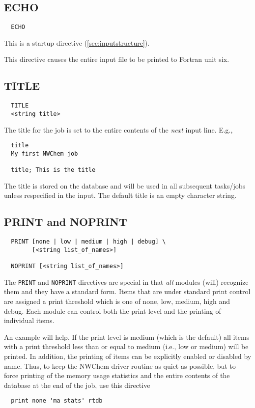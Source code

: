 \subsection{ECHO}

\begin{verbatim}
  ECHO
\end{verbatim}

This is a startup directive (\ref{sec:inputstructure}).

This directive causes the entire input file to be printed to Fortran
unit six.

\subsection{TITLE}

\begin{verbatim}
  TITLE 
  <string title>
\end{verbatim}

  The title for the job is set to the entire contents of the {\em
next} input line.  E.g.,
\begin{verbatim}
  title
  My first NWChem job

  title; This is the title
\end{verbatim}
The title is stored on the database and will be used in all subsequent
tasks/jobs unless respecified in the input.  The default title is an
empty character string.

\subsection{PRINT and NOPRINT}
\label{sec:printcontrol}

\begin{verbatim}
  PRINT [none | low | medium | high | debug] \
        [<string list_of_names>]

  NOPRINT [<string list_of_names>]
\end{verbatim}

The \verb+PRINT+ and \verb+NOPRINT+ directives are special in that
{\em all} modules (will) recognize them and they  have a
standard form.  Items that are under standard print control are
assigned a print threshold which is one of none, low, medium, high and
debug.  Each module can control both the print level and the printing
of individual items.

An example will help.  If the print level is medium (which is the
default) all items with a print threshold less than or equal to medium
(i.e., low or medium) will be printed.  In addition, the printing of
items can be explicitly enabled or disabled by name.  Thus, to keep
the NWChem driver routine as quiet as possible, but to force printing
of the memory usage statistics and the entire contents of the database
at the end of the job, use this directive
\begin{verbatim}
  print none 'ma stats' rtdb
\end{verbatim}

